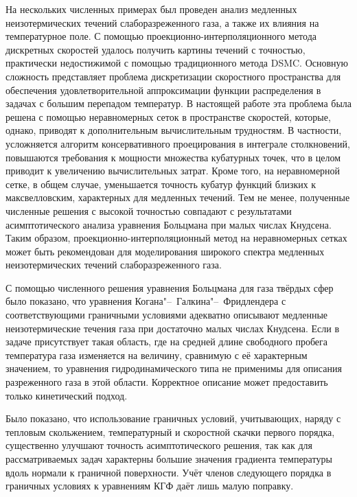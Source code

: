 \documentclass[
aps,%
12pt,%
final,%
notitlepage,%
oneside,%
onecolumn,%
nobibnotes,%
nofootinbib,%
superscriptaddress,%
noshowpacs,%
showkeys,%
floatfix,%
tightenlines,%
centertags]%
{revtex4}
\begin{document}
На нескольких численных примерах был проведен анализ медленных неизотермических течений
слаборазреженного газа, а также их влияния на температурное поле.
С помощью проекционно-интерполяционного метода дискретных скоростей удалось получить картины течений
с точностью, практически недостижимой с помощью традиционного метода DSMC.
Основную сложность представляет проблема дискретизации скоростного пространства
для обеспечения удовлетворительной аппроксимации функции распределения в задачах с большим перепадом температур.
В настоящей работе эта проблема была решена с помощью неравномерных сеток в пространстве скоростей,
которые, однако, приводят к дополнительным вычислительным трудностям.
В частности, усложняется алгоритм консервативного проецирования в интеграле столкновений,
повышаются требования к мощности множества кубатурных точек,
что в целом приводит к увеличению вычислительных затрат.
Кроме того, на неравномерной сетке, в общем случае, уменьшается точность кубатур
функций близких к максвелловским, характерных для медленных течений.
Тем не менее, полученные численные решения с высокой точностью совпадают с
результатами асимптотического анализа уравнения Больцмана при малых числах Кнудсена.
Таким образом, проекционно-интерполяционный метод на неравномерных сетках
может быть рекомендован для моделирования широкого спектра медленных неизотермических течений
слаборазреженного газа.

С помощью численного решения уравнения Больцмана для газа твёрдых сфер было показано,
что уравнения Когана"--~Галкина"--~Фридлендера с соответствующими граничными условиями
адекватно описывают медленные неизотермические течения газа при достаточно малых числах Кнудсена.
Если в задаче присутствует такая область, где на средней длине свободного пробега температура
газа изменяется на величину, сравнимую с её характерным значением, то уравнения гидродинамического типа
не применимы для описания разреженного газа в этой области. Корректное описание может предоставить
только кинетический подход.

Было показано, что использование граничных условий, учитывающих, наряду с тепловым скольжением,
температурный и скоростной скачки первого порядка,
существенно улучшают точность асимптотического решения, так как для рассматриваемых задач
характерны большие значения градиента температуры вдоль нормали к граничной поверхности.
Учёт членов следующего порядка в граничных условиях к уравнениям КГФ даёт лишь малую поправку.
\end{document}
